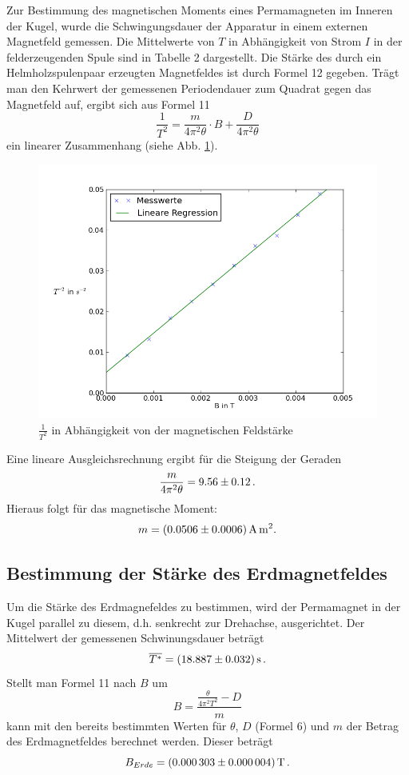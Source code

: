 \documentclass[11pt,ngerman,a4paper]{article}
\begin{document}
Zur Bestimmung des magnetischen Moments eines Permamagneten im Inneren der Kugel, wurde die Schwingungsdauer der Apparatur in einem externen Magnetfeld gemessen. Die Mittelwerte von $T$ in Abhängigkeit von Strom $I$ in der felderzeugenden Spule sind in Tabelle 2 dargestellt. Die Stärke des durch ein Helmholzspulenpaar erzeugten Magnetfeldes ist durch Formel 12 gegeben. Trägt man den Kehrwert der gemessenen Periodendauer zum Quadrat gegen das Magnetfeld auf, ergibt sich aus Formel 11
\begin{equation}
\frac1{T^2}= \frac{m}{4\pi^2\theta}\cdot B + \frac{D}{4\pi^2\theta} 
\end{equation}
ein linearer Zusammenhang (siehe Abb. \ref{ausw}).
\begin{figure}[h]
\centering
\includegraphics[scale=0.7]{Abb4.png}
\caption{$\frac1{T^2}$ in Abhängigkeit von der magnetischen Feldstärke}
\label{ausw}
\end{figure}
 Eine lineare Ausgleichsrechnung ergibt für die Steigung der Geraden 
\[
\frac{m}{4\pi^2\theta} = \num{9.56+-0.12}\,.
\]
Hieraus folgt für das magnetische Moment:
\[
m = \SI{0.0506+-0.0006}{\ampere\meter\squared}.
\]
\subsection{Bestimmung der Stärke des Erdmagnetfeldes}
Um die Stärke des Erdmagnefeldes zu bestimmen, wird der Permamagnet in der Kugel parallel zu diesem, d.h. senkrecht zur Drehachse, ausgerichtet. Der Mittelwert der gemessenen Schwinungsdauer beträgt
\[
\overline{T^*} = \SI{18.887+-0.032}{\second}\,.
\]
Stellt man Formel 11 nach $B$ um
\begin{equation}
B = \frac{\frac{\theta}{4\pi^2T^2}-D}{m}
\end{equation}
kann mit den bereits bestimmten Werten für $\theta$, $D$ (Formel 6) und $m$ der Betrag des Erdmagnetfeldes berechnet werden. Dieser beträgt
\[
B_{Erde} = \SI{0.000303+-0.000004}{\tesla}\,.
\]
\end{document}
